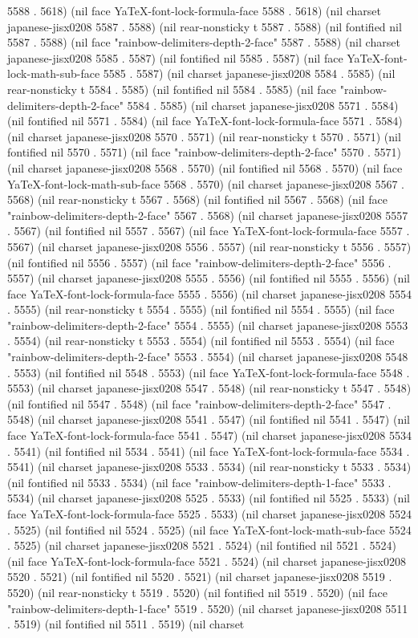 5588 . 5618) (nil face YaTeX-font-lock-formula-face 5588 . 5618) (nil charset japanese-jisx0208 5587 . 5588) (nil rear-nonsticky t 5587 . 5588) (nil fontified nil 5587 . 5588) (nil face "rainbow-delimiters-depth-2-face" 5587 . 5588) (nil charset japanese-jisx0208 5585 . 5587) (nil fontified nil 5585 . 5587) (nil face YaTeX-font-lock-math-sub-face 5585 . 5587) (nil charset japanese-jisx0208 5584 . 5585) (nil rear-nonsticky t 5584 . 5585) (nil fontified nil 5584 . 5585) (nil face "rainbow-delimiters-depth-2-face" 5584 . 5585) (nil charset japanese-jisx0208 5571 . 5584) (nil fontified nil 5571 . 5584) (nil face YaTeX-font-lock-formula-face 5571 . 5584) (nil charset japanese-jisx0208 5570 . 5571) (nil rear-nonsticky t 5570 . 5571) (nil fontified nil 5570 . 5571) (nil face "rainbow-delimiters-depth-2-face" 5570 . 5571) (nil charset japanese-jisx0208 5568 . 5570) (nil fontified nil 5568 . 5570) (nil face YaTeX-font-lock-math-sub-face 5568 . 5570) (nil charset japanese-jisx0208 5567 . 5568) (nil rear-nonsticky t 5567 . 5568) (nil fontified nil 5567 . 5568) (nil face "rainbow-delimiters-depth-2-face" 5567 . 5568) (nil charset japanese-jisx0208 5557 . 5567) (nil fontified nil 5557 . 5567) (nil face YaTeX-font-lock-formula-face 5557 . 5567) (nil charset japanese-jisx0208 5556 . 5557) (nil rear-nonsticky t 5556 . 5557) (nil fontified nil 5556 . 5557) (nil face "rainbow-delimiters-depth-2-face" 5556 . 5557) (nil charset japanese-jisx0208 5555 . 5556) (nil fontified nil 5555 . 5556) (nil face YaTeX-font-lock-formula-face 5555 . 5556) (nil charset japanese-jisx0208 5554 . 5555) (nil rear-nonsticky t 5554 . 5555) (nil fontified nil 5554 . 5555) (nil face "rainbow-delimiters-depth-2-face" 5554 . 5555) (nil charset japanese-jisx0208 5553 . 5554) (nil rear-nonsticky t 5553 . 5554) (nil fontified nil 5553 . 5554) (nil face "rainbow-delimiters-depth-2-face" 5553 . 5554) (nil charset japanese-jisx0208 5548 . 5553) (nil fontified nil 5548 . 5553) (nil face YaTeX-font-lock-formula-face 5548 . 5553) (nil charset japanese-jisx0208 5547 . 5548) (nil rear-nonsticky t 5547 . 5548) (nil fontified nil 5547 . 5548) (nil face "rainbow-delimiters-depth-2-face" 5547 . 5548) (nil charset japanese-jisx0208 5541 . 5547) (nil fontified nil 5541 . 5547) (nil face YaTeX-font-lock-formula-face 5541 . 5547) (nil charset japanese-jisx0208 5534 . 5541) (nil fontified nil 5534 . 5541) (nil face YaTeX-font-lock-formula-face 5534 . 5541) (nil charset japanese-jisx0208 5533 . 5534) (nil rear-nonsticky t 5533 . 5534) (nil fontified nil 5533 . 5534) (nil face "rainbow-delimiters-depth-1-face" 5533 . 5534) (nil charset japanese-jisx0208 5525 . 5533) (nil fontified nil 5525 . 5533) (nil face YaTeX-font-lock-formula-face 5525 . 5533) (nil charset japanese-jisx0208 5524 . 5525) (nil fontified nil 5524 . 5525) (nil face YaTeX-font-lock-math-sub-face 5524 . 5525) (nil charset japanese-jisx0208 5521 . 5524) (nil fontified nil 5521 . 5524) (nil face YaTeX-font-lock-formula-face 5521 . 5524) (nil charset japanese-jisx0208 5520 . 5521) (nil fontified nil 5520 . 5521) (nil charset japanese-jisx0208 5519 . 5520) (nil rear-nonsticky t 5519 . 5520) (nil fontified nil 5519 . 5520) (nil face "rainbow-delimiters-depth-1-face" 5519 . 5520) (nil charset japanese-jisx0208 5511 . 5519) (nil fontified nil 5511 . 5519) (nil charset 